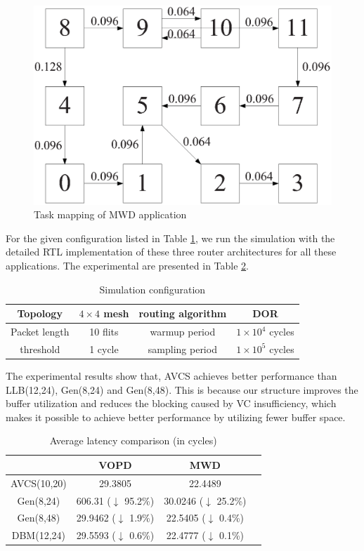 \documentclass[paper]{ieice}
\begin{document}
\begin{figure}[h]
  \centering
  \includegraphics[scale=0.4]{figures/mwd.eps}
  \caption{Task mapping of MWD application}\label{mwd}
\end{figure}

For the given configuration listed in Table \ref{configure}, we run the simulation with the detailed RTL implementation of these three router architectures for all these applications. The experimental are presented in Table \ref{realisticapp}.
\begin{table}[h]
  \centering\caption{Simulation configuration}\label{configure}
  \begin{tabular}{|c|c||c|c|}
    \hline
    Topology & $4\times 4$ mesh  &   routing algorithm & DOR\\
    \hline
    Packet length & 10 flits & warmup period &   $1\times 10^4$ cycles\\
    \hline
    threshold & 1 cycle & sampling period &   $1\times 10^5$ cycles\\
    \hline
    \end{tabular}
\end{table}

The experimental results show that, AVCS achieves better performance than LLB(12,24), Gen(8,24) and Gen(8,48). This is because our structure improves the buffer utilization and reduces the blocking caused by VC insufficiency, which makes it possible to achieve better performance by utilizing fewer buffer space.
\begin{table}[h]
  \centering\caption{Average latency comparison (in cycles)}\label{realisticapp}
\begin{tabular}{|c|c|c|c|}
\hline
 & VOPD & MWD\\
 \hline
AVCS(10,20) & 29.3805 & 22.4489\\
\hline
Gen(8,24) & 606.31 ($\downarrow$ 95.2\%) & 30.0246 ($\downarrow$ 25.2\%)\\
\hline
Gen(8,48) & 29.9462 ($\downarrow$ 1.9\%) & 22.5405 ($\downarrow$ 0.4\%)\\
\hline
DBM(12,24) & 29.5593 ($\downarrow$ 0.6\%) & 22.4777 ($\downarrow$ 0.1\%)\\
\hline
\end{tabular}
\end{table}
\end{document}
